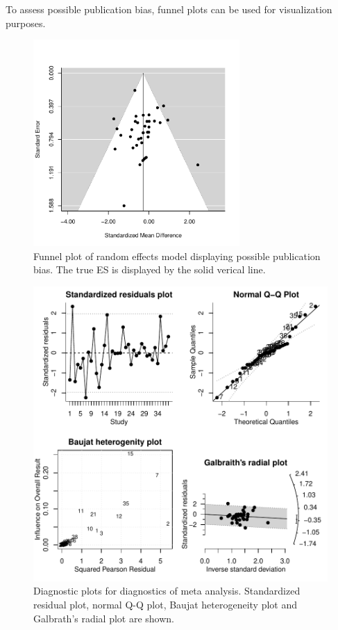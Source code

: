 \documentclass[11pt, a4paper]{article} %
\begin{document}
To assess possible publication bias, funnel plots can be used for visualization purposes.


\begin{figure}
\captionsetup{width=0.6\textwidth}
\centering
\includegraphics[width=0.7\textwidth]{sweave_document_TB-funnelplot}
\caption{Funnel plot of random effects model displaying possible publication bias. The true ES is displayed by the solid verical line.}
\end{figure}



\begin{figure}
\captionsetup{width=0.6\textwidth}
\centering
\includegraphics[width=1\textwidth]{sweave_document_TB-diagnostics}
\caption{Diagnostic plots for diagnostics of meta analysis. Standardized residual plot, normal Q-Q plot, Baujat heterogeneity plot and Galbrath's radial plot are shown.}
\label{fig:diagnostics}
\end{figure}
\end{document}
